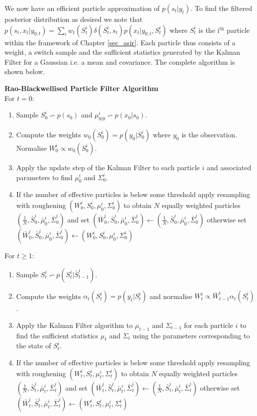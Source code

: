 We now have an efficient particle approximation of $p(s_t|y_t)$. To find the filtered posterior distribution as desired we note that $p(s_t,x_t|y_{0:t}) = \sum_i w_t(S_t^i)\delta(S_t^i, s_t)p(x_t|y_{0:t}, S_t^i)$ where $S_t^i$ is the i$^{\text{th}}$ particle within the framework of Chapter \ref{sec_asir}. Each particle thus consists of a weight, a switch sample and the sufficient statistics generated by the Kalman Filter for a Gaussian i.e. a mean and covariance. The complete algorithm is shown below.

\textbf{Rao-Blackwellised Particle Filter Algorithm}\\
For $t=0$:
\begin{enumerate}
\item
Sample $S^i_0 \backsim p(s_0)$ and $\mu_{0|0}^i \backsim p(x_0|s_0)$.
\item
Compute the weights $w_0(S_0^i) = p(y_0|S_0^i)$ where $y_0$ is the observation. Normalise $W^i_0 \propto w_0(S^i_0)$.
\item
Apply the update step of the Kalman Filter to each particle $i$ and associated parameters to find $\mu_0^i$ and $\Sigma_0^i$. 
\item
If the number of effective particles is below some threshold apply resampling with roughening $(W^i_0, {S}^i_0,{\mu}^i_0, {\Sigma}^i_0)$ to obtain $N$ equally weighted particles $(\frac{1}{N}, \bar{S}^i_0, \bar{\mu}^i_0, \bar{\Sigma}^i_0)$ and set $(\bar{W}^i_0, \bar{S}^i_0, \bar{\mu}^i_0, \bar{\Sigma}^i_0) \leftarrow (\frac{1}{N}, \bar{S}^i_0, \bar{\mu}^i_0, \bar{\Sigma}^i_0)$ otherwise set $(\bar{W}^i_0, \bar{S}^i_0, \bar{\mu}^i_0, \bar{\Sigma}^i_0) \leftarrow ({W}^i_0, {S}^i_0, \mu^i_0, \Sigma_0^i)$
\end{enumerate}
For $t \geq 1$:
\begin{enumerate}
\item
Sample $S^i_t \backsim p(S_t^i|\bar{S}^i_{t-1})$.
\item
Compute the weights $\alpha_t(S^i_{t}) = p(y_t|S_t^i)$ and normalise $W^i_t \propto \bar{W}^i_{t-1}\alpha_t(S^i_{t})$.
\item
Apply the Kalman Filter algorithm to $\mu_{t-1}$ and $\Sigma_{t-1}$ for each particle $i$ to find the sufficient statistics $\mu_{t}$ and $\Sigma_{t}$ using the parameters corresponding to the state of $S^i_t$.
\item
If the number of effective particles is below some threshold apply resampling with roughening $(W^i_t, {S}^i_t,{\mu}^i_t, {\Sigma}^i_t)$ to obtain $N$ equally weighted particles $(\frac{1}{N}, \bar{S}^i_t, \bar{\mu}^i_t, \bar{\Sigma}^i_t)$ and set $(\bar{W}^i_t, \bar{S}^i_t, \bar{\mu}^i_t, \bar{\Sigma}^i_t) \leftarrow (\frac{1}{N}, \bar{S}^i_t, \bar{\mu}^i_t, \bar{\Sigma}^i_t)$ otherwise set $(\bar{W}^i_t, \bar{S}^i_t, \bar{\mu}^i_t, \bar{\Sigma}^i_t) \leftarrow ({W}^i_t, {S}^i_t, \mu^i_t, \Sigma_t^i)$
\end{enumerate} 

